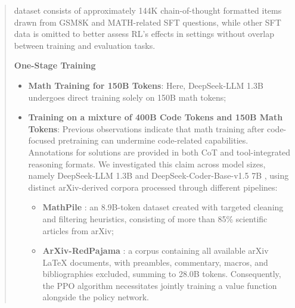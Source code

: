 \begin{abstract}
\begin{itemize}[topsep=0pt]
dataset consists of approximately 144K chain-of-thought formatted items drawn from GSM8K and MATH-related SFT questions, while other SFT data is omitted to better assess RL’s effects in settings without overlap between training and evaluation tasks. \end{itemize}

\textbf{One-Stage Training}

\begin{itemize}[topsep=0pt]
    \item \textbf{Math Training for 150B Tokens}: Here, DeepSeek-LLM 1.3B undergoes direct training solely on 150B math tokens;
    \item \textbf{Training on a mixture of 400B Code Tokens and 150B Math Tokens}: Previous observations indicate that math training after code-focused pretraining can undermine code-related capabilities. Annotations for solutions are provided in both CoT and tool-integrated reasoning formats. We investigated this claim across model sizes, namely DeepSeek-LLM 1.3B and DeepSeek-Coder-Base-v1.5 7B \citep{deepseek-coder}, using distinct arXiv-derived corpora processed through different pipelines:

\begin{itemize}[topsep=0pt]
    \item \textbf{MathPile} \citep{mathpile}: an 8.9B-token dataset created with targeted cleaning and filtering heuristics, consisting of more than 85\% scientific articles from arXiv;
    \item \textbf{ArXiv-RedPajama} \citep{redpajama}: a corpus containing all available arXiv LaTeX documents, with preambles, commentary, macros, and bibliographies excluded, summing to 28.0B tokens. Consequently, the PPO algorithm necessitates jointly training a value function alongside the policy network. \end{itemize}


\end{itemize}
\end{abstract}
